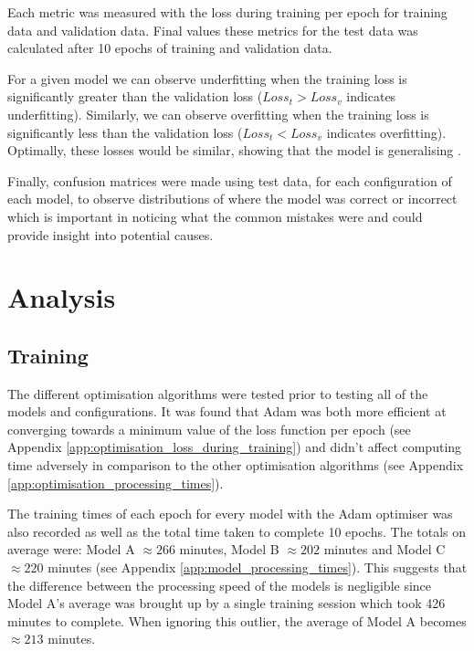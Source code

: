 \documentclass[12pt]{article}
\begin{document}
    Each metric was measured with the loss during training per epoch for training data and validation data. Final values these metrics for the test data was calculated after 10 epochs of training and validation data.\medskip
    
    For a given model we can observe underfitting when the training loss is significantly greater than the validation loss ($Loss_t > Loss_v$ indicates underfitting). Similarly, we can observe overfitting when the training loss is significantly less than the validation loss ($Loss_t < Loss_v$ indicates overfitting). Optimally, these losses would be similar, showing that the model is generalising \parencite{Stallard}.\medskip
    
    Finally, confusion matrices were made using test data, for each configuration of each model, to observe distributions of where the model was correct or incorrect which is important in noticing what the common mistakes were and could provide insight into potential causes.\medskip
    
    \newpage
	\section{Analysis}
	
	\subsection{Training}
	\label{sec:training_analysis}
	
    The different optimisation algorithms were tested prior to testing all of the models and configurations. It was found that Adam was both more efficient at converging towards a minimum value of the loss function per epoch (see Appendix \ref{app:optimisation_loss_during_training}) and didn't affect computing time adversely in comparison to the other optimisation algorithms (see Appendix \ref{app:optimisation_processing_times}).\medskip
    
    The training times of each epoch for every model with the Adam optimiser was also recorded as well as the total time taken to complete 10 epochs. The totals on average were: Model A $\approx 266$ minutes, Model B $\approx 202$ minutes and Model C $\approx 220$ minutes (see Appendix \ref{app:model_processing_times}). This suggests that the difference between the processing speed of the models is negligible since Model A's average was brought up by a single training session which took 426 minutes to complete. When ignoring this outlier, the average of Model A becomes $\approx 213$ minutes.\medskip
    
\end{document}
